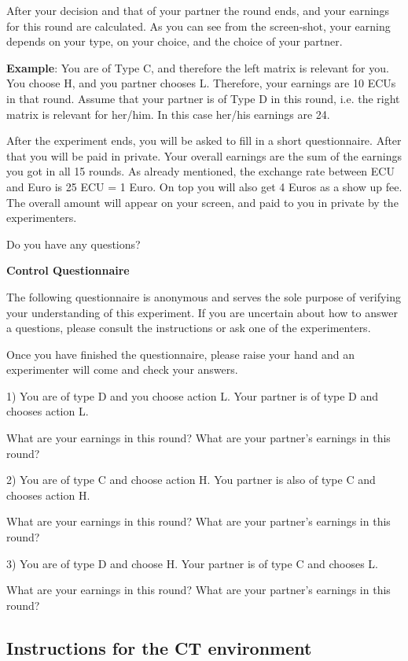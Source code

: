 \documentclass[12pt]{article}
\theoremstyle{break}
\begin{document}
After your decision and that of your partner the round ends, and your earnings for this round are calculated. As you can see from the screen-shot, your earning depends on your type, on your choice, and the choice of your partner. 

\textbf{Example}: You are of Type C, and therefore the left matrix is relevant for you. You choose H, and you partner chooses L. Therefore, your earnings are 10 ECUs in that round. Assume that your partner is of Type D in this round, i.e. the right matrix is relevant for her/him. In this case her/his earnings are 24. 

After the experiment ends, you will be asked to fill in a short questionnaire. After that you will be paid in private. Your overall earnings are the sum of the earnings you got in all 15 rounds. As already mentioned, the exchange rate between ECU and Euro is 25 ECU = 1 Euro. On top you will also get 4 Euros as a show up fee. The overall amount will appear on your screen, and paid to you in private by the experimenters. 

Do you have any questions? 




\textbf{Control Questionnaire}

The following questionnaire is anonymous and serves the sole purpose of verifying your understanding of this experiment. If you are uncertain about how to answer a questions, please consult the instructions or ask one of the experimenters.

Once you have finished the questionnaire, please raise your hand and an experimenter will come and check your answers.

1) You are of type D and you choose action L. Your partner is of type D and chooses action L.

What are your earnings in this round?
What are your partner’s earnings in this round?

2) You are of type C and choose action H. You partner is also of type C and chooses action H.

What are your earnings in this round?
What are your partner’s earnings in this round?


3) You are of type D and choose H. Your partner is of type C and chooses L.

What are your earnings in this round?
What are your partner’s earnings in this round?


\subsection{Instructions for the CT environment}
\end{document}

